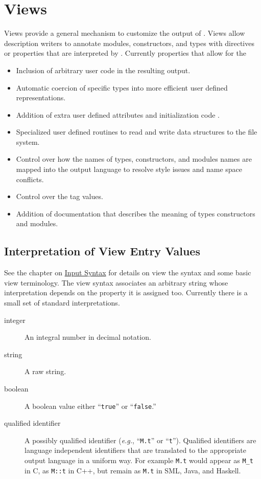 %
\chapter{Views}
\label{chap:views}

Views provide a general mechanism to customize the output of
\asdlgen{}.
Views allow description writers to annotate modules,
constructors, and types with directives or properties that are interpreted
by \asdlgen{}.
Currently \asdlgen{} properties that allow for the 
\begin{itemize}
  \item
    Inclusion of arbitrary user code in the resulting output.
  \item
    Automatic coercion of specific types into more efficient user
    defined representations.
  \item
    Addition of extra user defined attributes and initialization code .
  \item
    Specialized user defined routines to read and write data structures to the
    file system.
  \item
    Control over how the names of types, constructors, and modules names
    are mapped into the output language to resolve style issues and name space
    conflicts.
  \item
    Control over the tag values.
  \item
    Addition of documentation that describes the meaning of types
    constructors and modules.
\end{itemize}%

\section{Interpretation of View Entry Values}

See the chapter on \hyperref[chap:syntax]{Input Syntax} for details on
view the syntax and some basic view terminology. The view syntax associates
an arbitrary string whose interpretation depends on the property it is
assigned too. Currently there is a small set of standard interpretations.

\begin{description}
  \item[integer]
    An integral number in decimal notation.
  \item[string]
    A raw string.
  \item[boolean]
    A boolean value either ``\lstinline!true!'' or ``\lstinline!false!.''
  \item[qualified identifier]
    A possibly qualified identifier (\textit{e.g.}, ``\lstinline!M.t!'' or ``\lstinline!t!'').
    Qualified identifiers are language independent
    identifiers that are translated to the appropriate output language in a
    uniform way.
    For example \lstinline!M.t! would appear as \lstinline!M_t! in C, as \lstinline!M::t! in C++, but
    remain as \lstinline!M.t! in SML, Java, and Haskell.
\end{description}%


